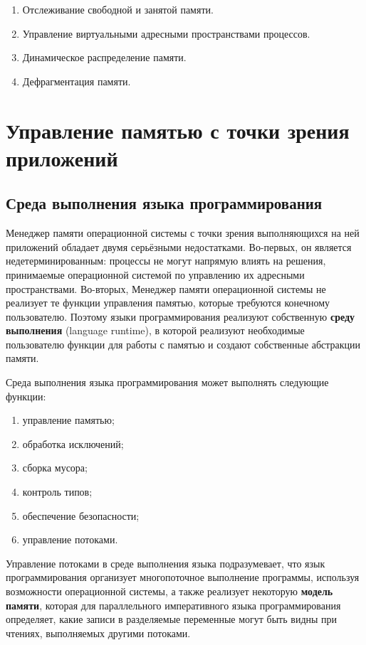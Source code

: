 \begin{enumerate}[label*=\arabic*.]
	\item Отслеживание свободной и занятой памяти.
	\item Управление виртуальными адресными пространствами процессов.
	\item Динамическое распределение памяти. 
	\item Дефрагментация памяти. 
\end{enumerate}



\section{Управление памятью с точки зрения приложений}

\subsection{Среда выполнения языка программирования}

Менеджер памяти операционной системы с точки зрения выполняющихся на ней приложений обладает двумя серьёзными недостатками. Во-первых, он является недетерминированным: процессы не могут напрямую влиять на решения, принимаемые операционной системой по управлению их адресными пространствами. Во-вторых, Менеджер памяти операционной системы не реализует те функции управления памятью, которые требуются конечному пользователю. Поэтому языки программирования реализуют собственную \textbf{среду выполнения} (language runtime), в которой реализуют необходимые пользователю функции для работы с памятью и создают собственные абстракции памяти.

Среда выполнения языка программирования может выполнять следующие функции: \cite{dotnet_clr}

\begin{enumerate}[label*=\arabic*)]
	\item управление памятью;
	\item обработка исключений; 
	\item сборка мусора; 
	\item контроль типов;
	\item обеспечение безопасности; 
	\item управление потоками. 
\end{enumerate}

Управление потоками в среде выполнения языка подразумевает, что язык программирования организует многопоточное выполнение программы, используя возможности операционной системы, а также реализует некоторую \textbf{модель памяти}, которая для параллельного императивного языка программирования определяет, какие записи в разделяемые переменные могут быть видны при чтениях, выполняемых другими потоками. \cite{memory_model}

